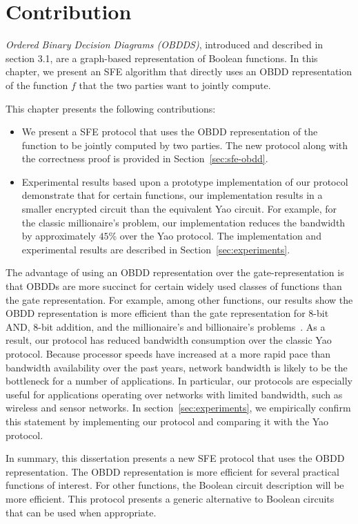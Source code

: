 \section{Contribution}
\label{sec:obdd-intro}



{\it Ordered Binary Decision Diagrams (OBDDS)}, introduced and
described in section 3.1, are a graph-based representation of Boolean
functions.  In this chapter, we present an
SFE algorithm that directly uses an OBDD representation of the
function $f$ that the two parties want to jointly compute. 

This chapter presents the following contributions:
\begin{itemize}
\item We present a SFE protocol that uses the OBDD representation of
the function to be jointly computed by two parties. The new protocol along with the
correctness proof is provided in Section~\ref{sec:sfe-obdd}.

\item 
Experimental results based upon a prototype implementation of our
protocol demonstrate that for certain functions, our
implementation results in a smaller encrypted circuit than
the equivalent Yao circuit. For example, for the classic millionaire's problem, our
implementation reduces the bandwidth by approximately $45$\% over the Yao
protocol.  The
implementation and experimental results are described in
Section~\ref{sec:experiments}.
\end{itemize}

The
advantage of using an OBDD representation over the gate-representation
is that OBDDs are more succinct for certain widely used classes of
functions than the gate representation. For example, among other
functions, our results show the OBDD representation is more efficient
than the gate representation for 8-bit AND, 8-bit addition, and the
millionaire's and billionaire's problems~\cite{Yao86}.  As a result,
our protocol has reduced bandwidth consumption over the classic Yao
protocol.  Because processor speeds have
increased at a more rapid pace than bandwidth availability over the
past years, network bandwidth is likely to be the bottleneck for a number of applications. In particular, our
protocols are especially useful for applications operating over
networks with limited bandwidth, such as wireless and sensor networks.
In section~\ref{sec:experiments}, we empirically confirm this statement by
implementing our protocol and comparing it with the Yao protocol.

In summary, this dissertation presents a new SFE protocol that uses the OBDD representation.
The OBDD representation is more efficient for several practical functions of 
interest. For other functions, the Boolean circuit description will be more 
efficient. This protocol presents a generic alternative to 
Boolean circuits that can be used when appropriate. 


